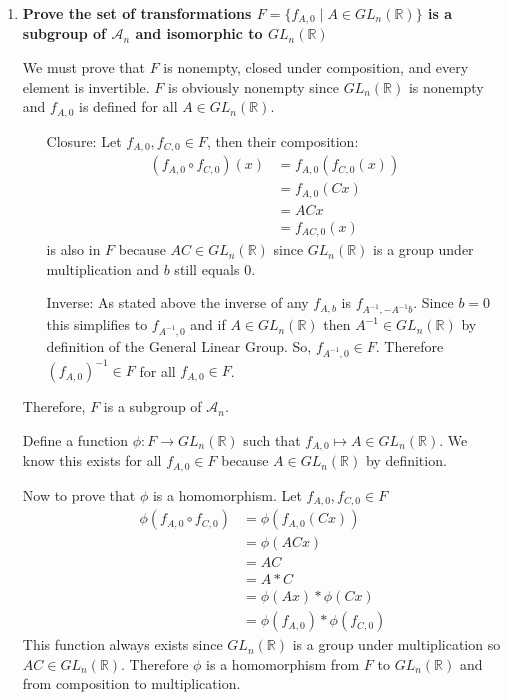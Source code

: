 \documentclass[12pt,letterpaper]{article}
\begin{document}
\begin{enumerate}
\begin{itemize}
    \end{itemize}
    \item \textbf{Prove the set of transformations $F = \{f_{A,0} \mid A\in GL_n(\mathbb{R})\}$ is a subgroup of $\mathcal{A}_n$ and isomorphic to $GL_n(\mathbb{R})$}
    
    We must prove that $F$ is nonempty, closed under composition, and every element is invertible. $F$ is obviously nonempty since $GL_n(\mathbb{R})$ is nonempty and $f_{A,0}$ is defined for all $A\in GL_n(\mathbb{R})$. \cite{Algebra}
    \begin{itemize}
        \item [Closure:] Let $f_{A,0},f_{C,0}\in F$, then their composition: 
        \begin{align*}
            (f_{A,0}\circ f_{C,0})(x) &= f_{A,0}(f_{C,0}(x))\\
            &= f_{A,0}(Cx)\\
            &= ACx\\
            &= f_{AC,0}(x)
        \end{align*}
        is also in $F$ because $AC\in GL_n(\mathbb{R})$ since $GL_n(\mathbb{R})$ is a group under multiplication and $b$ still equals 0.
        
        \item [Inverse:] As stated above the inverse of any $f_{A,b}$ is $f_{A^{-1},-A^{-1}b}$. Since $b=0$ this simplifies to $f_{A^{-1},0}$ and if $A\in GL_n(\mathbb{R})$ then $A^{-1}\in GL_n(\mathbb{R})$ by definition of the General Linear Group. So, $f_{A^{-1},0}\in F$. Therefore $(f_{A,0})^{-1}\in F$ for all $f_{A,0}\in F$.
    \end{itemize}
    
    Therefore, $F$ is a subgroup of $\mathcal{A}_n$.
    
    Define a function $\phi: F \rightarrow GL_n(\mathbb{R})$ such that $f_{A,0} \mapsto A\in GL_n(\mathbb{R})$. We know this exists for all $f_{A,0}\in F$ because $A\in GL_n(\mathbb{R})$ by definition. 
    
    Now to prove that $\phi$ is a homomorphism. \cite{Algebra} Let $f_{A,0},f_{C,0}\in F$
    \begin{align*}
        \phi(f_{A,0}\circ f_{C,0}) &= \phi(f_{A,0}(Cx))\\
        &= \phi(ACx)\\
        &= AC\\
        &= A*C\\
        &= \phi(Ax)*\phi(Cx)\\
        &= \phi(f_{A,0})*\phi(f_{C,0})
    \end{align*}
    This function always exists since $GL_n(\mathbb{R})$ is a group under multiplication so $AC\in GL_n(\mathbb{R})$. Therefore $\phi$ is a homomorphism from $F$ to $GL_n(\mathbb{R})$ and from composition to multiplication.
    

\end{enumerate}
\end{document}

